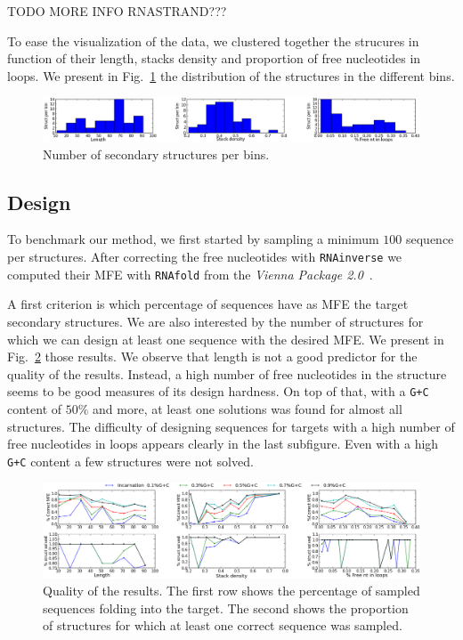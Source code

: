  TODO MORE INFO RNASTRAND???
 
 To ease the visualization of the data, we clustered together the strucures
 in function of their length, stacks density and proportion of free 
 nucleotides in loops. We present in Fig.~\ref{fig:bins} the distribution
 of the structures in the different bins.
 
 \begin{figure}[ht!]
 	\centering
	\includegraphics[scale=0.45]{Figures/bins_distribution.png}
	\caption{Number of secondary structures per bins.}
	\label{fig:bins}
 \end{figure}
 
 
\subsection{Design}
 To benchmark our method, we first started by sampling a minimum
 $100$ sequence per structures. After correcting the free nucleotides with
 \texttt{RNAinverse} we computed their MFE with \texttt{RNAfold} from the \textit{Vienna Package 2.0}~\cite{Hofacker:1994}.
 
A first criterion is which percentage of sequences have as MFE the target
secondary structures. We are also interested by the number of structures
for which we can design at least one sequence with the desired MFE. We
present in Fig.~\ref{fig:mfe_struct_solved} those results. We observe
that length is not a good predictor for the quality of the results. Instead,
a high number of free nucleotides in the structure seems to be good measures of its design hardness. 
On top of that, with a \texttt{G+C} content of $50\%$ and more, at least
one solutions was found for almost all structures. The difficulty of 
designing sequences for targets with a high number of free nucleotides 
 in loops appears clearly in the last subfigure. Even with a high \texttt{G+C} content a few structures were not solved. 

\begin{figure}[ht!]	
	\centering
	\includegraphics[scale=0.45]{Figures/mfe_struct_solved}
	\caption{Quality of the results. The first row shows the percentage
	of sampled sequences folding into the target. The second shows the 	
	proportion	of structures for which at least one correct sequence was 
	sampled.}
	\label{fig:mfe_struct_solved}	
\end{figure}
 
